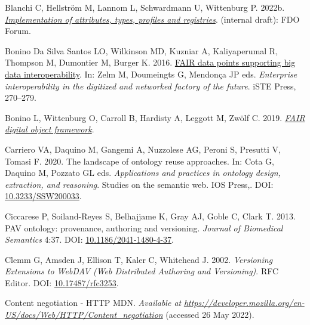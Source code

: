 \begin{CSLReferences}{1}{0}
\leavevmode{}%
Blanchi C, Hellström M, Lannom L, Schwardmann U, Wittenburg P. 2022b. \emph{\href{https://docs.google.com/document/d/1RrOiwMhkl-hRzWmlluA2iXCzHK-bj7_80LlMXgWx4w4/edit}{Implementation of attributes, types, profiles and registries}}. (internal draft): FDO Forum.

\leavevmode{}%
Bonino Da Silva Santos LO, Wilkinson MD, Kuzniar A, Kaliyaperumal R, Thompson M, Dumontier M, Burger K. 2016. \href{https://www.researchgate.net/publication/\%7B309468587/_FAIR/_Data/_Points/_Supporting/_Big/_Data/_Interoperability\%7D}{FAIR data points supporting big data interoperability}. In: Zelm M, Doumeingts G, Mendonça JP eds. \emph{Enterprise interoperability in the digitized and networked factory of the future}. iSTE Press, 270--279.

\leavevmode{}%
Bonino L, Wittenburg O, Carroll B, Hardisty A, Leggott M, Zwölf C. 2019. \emph{\href{https://github.com/GEDE-RDA-Europe/GEDE/blob/master/FAIR\%20Digital\%20Objects/FDOF/FAIR\%20Digital\%20Object\%20Framework-v1-02.docx}{FAIR digital object framework}}.

\leavevmode{}%
Carriero VA, Daquino M, Gangemi A, Nuzzolese AG, Peroni S, Presutti V, Tomasi F. 2020. The landscape of ontology reuse approaches. In: Cota G, Daquino M, Pozzato GL eds. \emph{Applications and practices in ontology design, extraction, and reasoning}. Studies on the semantic web. IOS Press,. DOI: \href{https://doi.org/10.3233/SSW200033}{10.3233/SSW200033}.

\leavevmode{}%
Ciccarese P, Soiland-Reyes S, Belhajjame K, Gray AJ, Goble C, Clark T. 2013. PAV ontology: provenance, authoring and versioning. \emph{Journal of Biomedical Semantics} 4:37. DOI: \href{https://doi.org/10.1186/2041-1480-4-37}{10.1186/2041-1480-4-37}.

\leavevmode{}%
Clemm G, Amsden J, Ellison T, Kaler C, Whitehead J. 2002. \emph{Versioning Extensions to WebDAV (Web Distributed Authoring and Versioning)}. RFC Editor. DOI: \href{https://doi.org/10.17487/rfc3253}{10.17487/rfc3253}.

\leavevmode{}%
Content negotiation - HTTP \textbar{} MDN. \emph{Available at} \href{https://developer.mozilla.org/en-US/docs/Web/HTTP/Content_negotiation}{\emph{https://developer.mozilla.org/en-US/docs/Web/HTTP/Content\_negotiation}} (accessed 26 May 2022).


\end{CSLReferences}
